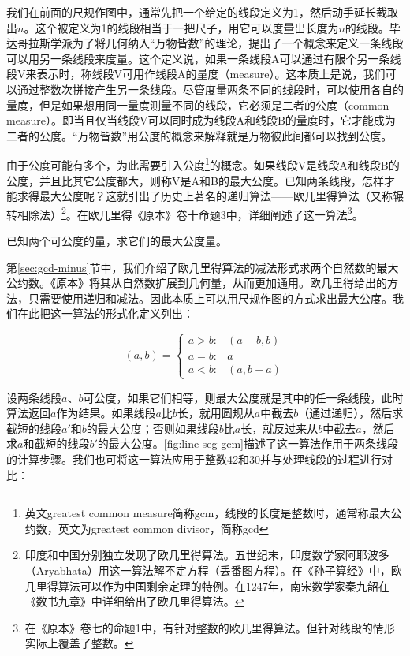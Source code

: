 \documentclass[b5paper]{ctexart}
\begin{document}
我们在前面的尺规作图中，通常先把一个给定的线段定义为1，然后动手延长截取出$n$。这个被定义为1的线段相当于一把尺子，用它可以度量出长度为$n$的线段。毕达哥拉斯学派为了将几何纳入“万物皆数”的理论，提出了一个概念来定义一条线段可以用另一条线段来度量。这个定义说，如果一条线段A可以通过有限个另一条线段V来表示时，称线段V可用作线段A的量度（measure）。这本质上是说，我们可以通过整数次拼接产生另一条线段。尽管度量两条不同的线段时，可以使用各自的量度，但是如果想用同一量度测量不同的线段，它必须是二者的公度（common measure）。即当且仅当线段V可以同时成为线段A和线段B的量度时，它才能成为二者的公度。“万物皆数”用公度的概念来解释就是万物彼此间都可以找到公度。

由于公度可能有多个，为此需要引入公度\footnote{英文greatest common measure简称gcm，线段的长度是整数时，通常称最大公约数，英文为greatest common divisor，简称gcd}的概念。如果线段V是线段A和线段B的公度，并且比其它公度都大，则称V是A和B的最大公度。已知两条线段，怎样才能求得最大公度呢？这就引出了历史上著名的递归算法——欧几里得算法（又称辗转相除法）\footnote{印度和中国分别独立发现了欧几里得算法。五世纪末，印度数学家阿耶波多（Aryabhata）用这一算法解不定方程（丢番图方程）。在《孙子算经》中，欧几里得算法可以作为中国剩余定理的特例。在1247年，南宋数学家秦九韶在《数书九章》中详细给出了欧几里得算法。}。在欧几里得《原本》卷十命题3中\cite{Elements}，详细阐述了这一算法\footnote{在《原本》卷七的命题1中，有针对整数的欧几里得算法。但针对线段的情形实际上覆盖了整数。}。

\begin{proposition}[《原本》，卷十，命题3]
已知两个可公度的量，求它们的最大公度量。
\end{proposition}

第\ref{sec:gcd-minus}节中，我们介绍了欧几里得算法的减法形式求两个自然数的最大公约数。《原本》将其从自然数扩展到几何量，从而更加通用。欧几里得给出的方法，只需要使用递归和减法。因此本质上可以用尺规作图的方式求出最大公度。我们在此把这一算法的形式化定义列出：

\[
(a, b) = \begin{cases}
  a > b :& (a - b, b) \\
  a = b :& a \\
  a < b :& (a, b - a)
  \end{cases}
\]

设两条线段$a$、$b$可公度，如果它们相等，则最大公度就是其中的任一条线段，此时算法返回$a$作为结果。如果线段$a$比$b$长，就用圆规从$a$中截去$b$（通过递归），然后求截短的线段$a'$和$b$的最大公度；否则如果线段$b$比$a$长，就反过来从$b$中截去$a$，然后求$a$和截短的线段$b'$的最大公度。\cref{fig:line-seg-gcm}描述了这一算法作用于两条线段的计算步骤。我们也可将这一算法应用于整数42和30并与处理线段的过程进行对比：
\end{document}
